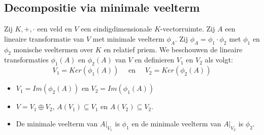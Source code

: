 \documentclass[main.tex]{subfiles}
\begin{document}
\subsection{Decompositie via minimale veelterm}
\label{sec:decomp-via-minim}

\begin{pr}
  Zij $K,+,\cdot$ een veld en $V$ een eindigdimensionale $K$-vectorruimte.
  Zij $A$ een lineaire transformatie van $V$ met minimale veelterm $\phi_{A}$.
  Zij $\phi_{A} = \phi_{1} \cdot \phi_{2}$ met $\phi_{1}$ en $\phi_{2}$ monische veeltermen over $K$ en relatief priem.
  We beschouwen de lineaire transformaties $\phi_{1}(A)$ en $\phi_{2}(A)$ van $V$ en definieren $V_{1}$ en $V_{2}$ als volgt:
  \[ V_{1} = Ker(\phi_{1}(A)) \quad\text{ en }\quad V_{2} = Ker(\phi_{2}(A)) \]
  \begin{itemize}
  \item $V_{1} = Im(\phi_{2}(A))$ en $V_{2} = Im(\phi_{1}(A))$
  \item $V = V_{1} \oplus V_{2}$, $A(V_{1}) \subseteq V_{1}$ en $A(V_{2}) \subseteq V_{2}$.
  \item De minimale veelterm van $A|_{V_{1}}$ is $\phi_{1}$ en de minimale veelterm van $A|_{V_{2}}$ is $\phi_{2}$.
  \end{itemize}
  

\end{pr}
\end{document}
